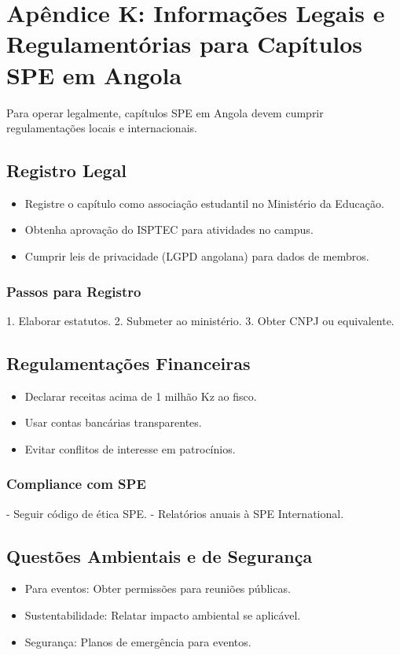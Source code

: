 \documentclass[12pt]{article}
\begin{document}
\section{Apêndice K: Informações Legais e Regulamentórias para Capítulos SPE em Angola}

Para operar legalmente, capítulos SPE em Angola devem cumprir regulamentações locais e internacionais.

\subsection{Registro Legal}
\begin{itemize}
    \item Registre o capítulo como associação estudantil no Ministério da Educação.
    \item Obtenha aprovação do ISPTEC para atividades no campus.
    \item Cumprir leis de privacidade (LGPD angolana) para dados de membros.
\end{itemize}

\subsubsection{Passos para Registro}
1. Elaborar estatutos.
2. Submeter ao ministério.
3. Obter CNPJ ou equivalente.

\subsection{Regulamentações Financeiras}
\begin{itemize}
    \item Declarar receitas acima de 1 milhão Kz ao fisco.
    \item Usar contas bancárias transparentes.
    \item Evitar conflitos de interesse em patrocínios.
\end{itemize}

\subsubsection{Compliance com SPE}
- Seguir código de ética SPE.
- Relatórios anuais à SPE International.

\subsection{Questões Ambientais e de Segurança}
\begin{itemize}
    \item Para eventos: Obter permissões para reuniões públicas.
    \item Sustentabilidade: Relatar impacto ambiental se aplicável.
    \item Segurança: Planos de emergência para eventos.
\end{itemize}
\end{document}
